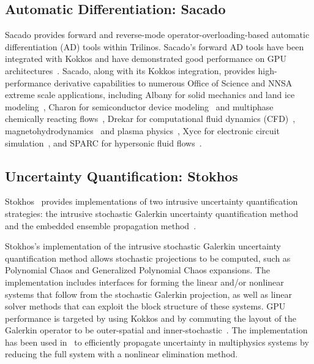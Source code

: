 \subsection{Automatic Differentiation: Sacado} \label{sec:sacado}

Sacado \cite{SacadoURL,phipps2012efficient,phipps2008large} provides forward and reverse-mode operator-overloading-based automatic differentiation (AD) tools within Trilinos.
Sacado's forward AD tools have been integrated with Kokkos and have demonstrated good performance on GPU architectures~\cite{phipps2022automatic}.
Sacado, along with its Kokkos integration, provides high-performance derivative capabilities to numerous Office of Science and NNSA extreme scale applications, including Albany for solid mechanics and land ice modeling~\cite{Salinger2016,MPASAlbany2018}, 
Charon for semiconductor device modeling~\cite{CharonUsersManual2020} and multiphase chemically reacting flows~\cite{Musson2009}, Drekar for computational fluid dynamics (CFD)~\cite{Sondak2021,Shadid2016}, magnetohydrodynamics~\cite{Shadid2016mhd} and 
plasma physics~\cite{Crockatt2022,Miller2019}, Xyce for electronic circuit simulation~\cite{xyceTrilinos,xycePCE}, and SPARC for hypersonic fluid flows~\cite{SparcValidation}. 

\subsection{Uncertainty Quantification: Stokhos}

Stokhos~\cite{phipps2015stokhos,Phipps2016,phipps2014exploring} provides implementations of two intrusive uncertainty quantification strategies: 
the intrusive stochastic Galerkin uncertainty quantification method~\cite{ghanem1990polynomial,ghanem2003stochastic} and the embedded ensemble propagation method~\cite{phipps2017embedded}.

Stokhos's implementation of the intrusive stochastic Galerkin uncertainty quantification method allows stochastic projections to be computed, such as Polynomial Chaos and Generalized Polynomial Chaos expansions.
The implementation includes interfaces for forming the linear and/or nonlinear systems that follow from the stochastic Galerkin projection, as well as linear solver methods that can exploit the block structure of these systems.
GPU performance is targeted by using Kokkos and by commuting the layout of the Galerkin operator to be outer-spatial and inner-stochastic~\cite{phipps2014exploring}.
The implementation has been used in~\cite{constantine2014efficient} to efficiently propagate uncertainty in multiphysics systems by reducing the full system with a nonlinear elimination method.


